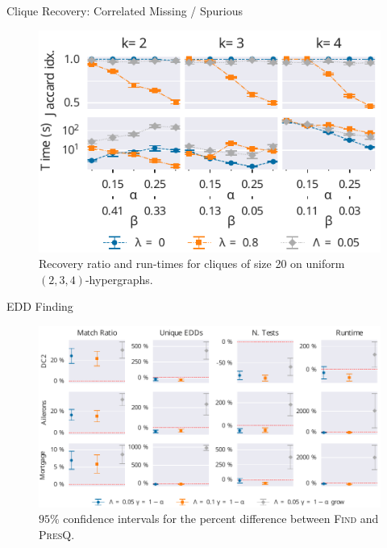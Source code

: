 \documentclass[10pt]{beamer}
\newcommand{\PresQ}[0]{\textsc{PresQ}\xspace}
\begin{document}
\begin{frame}{Clique Recovery: Correlated Missing / Spurious}
\begin{figure}
    \centering
    \includegraphics{quasi_corr_20}
    \caption{
    Recovery ratio and run-times for cliques of size 20 on uniform $(2,3,4)$-hypergraphs.
    }
\end{figure}
\end{frame}

\begin{frame}{EDD Finding}
\begin{figure}
    \centering
    \includegraphics[width=\textwidth]{all}
    \caption{$95\%$ confidence intervals for the percent difference
    between \textsc{Find} and \PresQ.}
\end{figure}
\end{frame}
\end{document}
